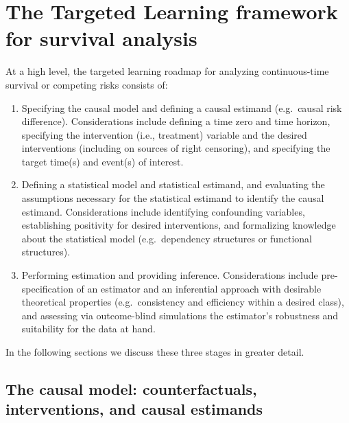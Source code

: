 \hypertarget{sec-targeted-learning}{%
\section{The Targeted Learning framework for survival analysis}\label{sec-targeted-learning}}

At a high level, the targeted learning roadmap for analyzing continuous-time survival or competing risks consists of:

\begin{enumerate}
\def\labelenumi{\arabic{enumi}.}
\tightlist
\item
  Specifying the causal model and defining a causal estimand (e.g.~causal risk difference). Considerations include defining a time zero and time horizon, specifying the intervention (i.e., treatment) variable and the desired interventions (including on sources of right censoring), and specifying the target time(s) and event(s) of interest.
\item
  Defining a statistical model and statistical estimand, and evaluating the assumptions necessary for the statistical estimand to identify the causal estimand. Considerations include identifying confounding variables, establishing positivity for desired interventions, and formalizing knowledge about the statistical model (e.g.~dependency structures or functional structures).
\item
  Performing estimation and providing inference. Considerations include pre-specification of an estimator and an inferential approach with desirable theoretical properties (e.g.~consistency and efficiency within a desired class), and assessing via outcome-blind simulations the estimator's robustness and suitability for the data at hand.
\end{enumerate}

In the following sections we discuss these three stages in greater detail.

\hypertarget{sec-causal}{%
\subsection{The causal model: counterfactuals, interventions, and causal estimands}\label{sec-causal}}

